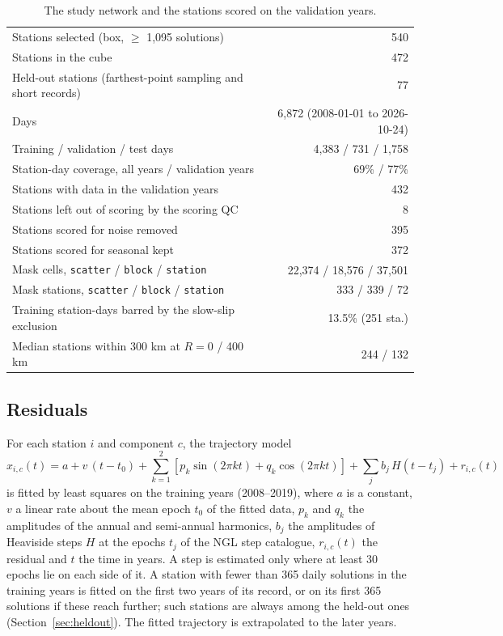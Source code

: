 \documentclass[preprint,12pt,authoryear]{elsarticle}
\begin{document}
\begin{table}[tbp]
  \centering
  \caption{The study network and the stations scored on the validation years.}
  \label{tab:coverage}
  \small
  \begin{tabular}{>{\raggedright\arraybackslash}p{7.2cm} r}
    \toprule
    Stations selected (box, $\ge$ 1,095 solutions) & 540 \\
    Stations in the cube & 472 \\
    Held-out stations (farthest-point sampling and short records) & 77 \\
    Days & 6,872 (2008-01-01 to 2026-10-24) \\
    Training / validation / test days & 4,383 / 731 / 1,758 \\
    Station-day coverage, all years / validation years & 69\% / 77\% \\
    Stations with data in the validation years & 432 \\
    Stations left out of scoring by the scoring QC & 8 \\
    Stations scored for noise removed & 395 \\
    Stations scored for seasonal kept & 372 \\
    Mask cells, \texttt{scatter} / \texttt{block} / \texttt{station} & 22,374 / 18,576 / 37,501 \\
    Mask stations, \texttt{scatter} / \texttt{block} / \texttt{station} & 333 / 339 / 72 \\
    Training station-days barred by the slow-slip exclusion & 13.5\% (251 sta.) \\
    Median stations within 300 km at $R = 0$ / 400 km & 244 / 132 \\
    \bottomrule
  \end{tabular}
\end{table}

\subsection{Residuals}
\label{sec:residuals}

For each station $i$ and component $c$, the trajectory model
\begin{equation}
  x_{i,c}(t) = a + v\,(t - t_0) + \sum_{k=1}^{2}\left[p_k \sin(2\pi k t) + q_k \cos(2\pi k t)\right] + \sum_{j} b_j\, H(t - t_j) + r_{i,c}(t)
  \label{eq:trajectory}
\end{equation}
is fitted by least squares on the training years (2008--2019), where $a$ is a constant, $v$ a linear rate about the mean epoch $t_0$ of the fitted data, $p_k$ and $q_k$ the amplitudes of the annual and semi-annual harmonics, $b_j$ the amplitudes of Heaviside steps $H$ at the epochs $t_j$ of the NGL step catalogue, $r_{i,c}(t)$ the residual and $t$ the time in years. A step is estimated only where at least 30 epochs lie on each side of it. A station with fewer than 365 daily solutions in the training years is fitted on the first two years of its record, or on its first 365 solutions if these reach further; such stations are always among the held-out ones (Section~\ref{sec:heldout}). The fitted trajectory is extrapolated to the later years.
\end{document}

